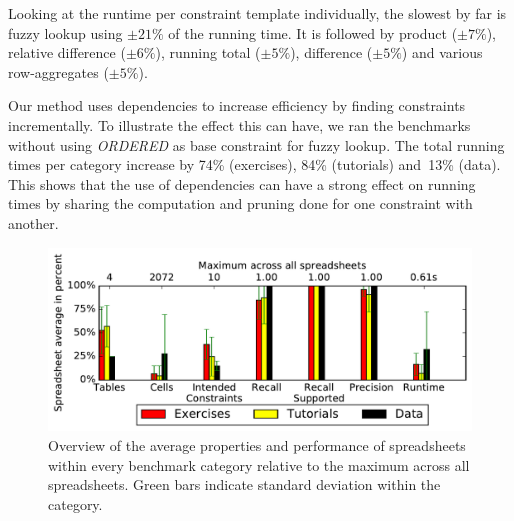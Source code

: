 


Looking at the runtime per constraint template individually, the slowest by far is fuzzy lookup using $\pm 21\%$ of the running time.
It is followed by product ($\pm 7\%$), relative difference ($\pm 6\%$), running total ($\pm 5\%$), difference ($\pm 5\%$) and various row-aggregates ($\pm 5\%$).

Our method uses dependencies to increase efficiency by finding constraints incrementally. To illustrate the effect this can have, we ran the benchmarks without using \textit{ORDERED} as base constraint for fuzzy lookup.
The total running times per category increase by 74\% (exercises), 84\% (tutorials) and~13\% (data).
This shows that the use of dependencies can have a strong effect on running times by sharing the computation and pruning done for one constraint with another.

\begin{figure}[t]
  \centering
  \includegraphics[width=1\linewidth]{figures/comparison.pdf}
  \caption{Overview of the average properties and performance of spreadsheets within every benchmark category relative to the maximum across all spreadsheets.
  Green bars indicate standard deviation within the category.}
  \label{fig:comparison}
\end{figure}


